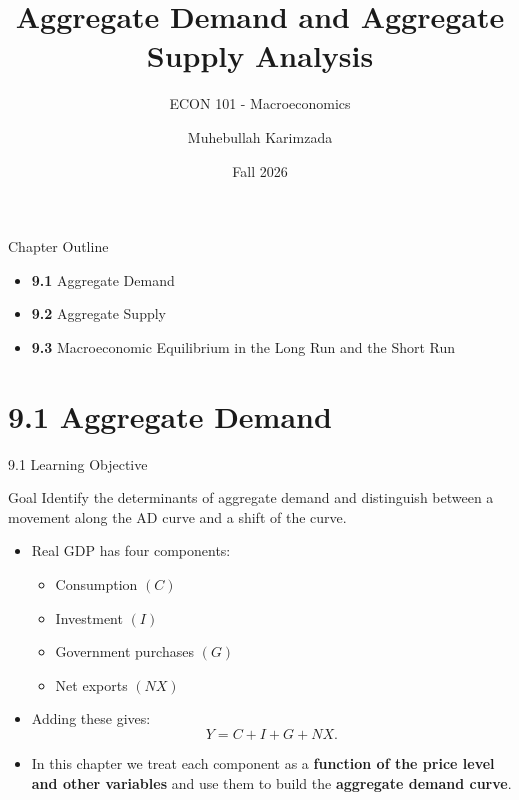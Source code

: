 \documentclass[aspectratio=169]{beamer}
\title{\textbf{Aggregate Demand and Aggregate Supply Analysis \vspace{.5cm}\\  }}
\subtitle{ {\large ECON 101 - Macroeconomics}}
\author{Muhebullah Karimzada}
\date{Fall 2026}
\begin{document}
\begin{frame}[plain]
  \titlepage
\end{frame}

\begin{frame}{Chapter Outline}
\transfade
\begin{itemize}
  \item \textbf{9.1} Aggregate Demand
  \item \textbf{9.2} Aggregate Supply
  \item \textbf{9.3} Macroeconomic Equilibrium in the Long Run and the Short Run
\end{itemize}
\end{frame}

\section{9.1 Aggregate Demand}

\begin{frame}{9.1 Learning Objective}
\transfade
\begin{block}{Goal}
Identify the determinants of aggregate demand and distinguish between a movement along the AD curve and a shift of the curve.
\end{block}
\begin{itemize}
  \item Real GDP has four components:
  \begin{itemize}
    \item Consumption \((C)\)
    \item Investment \((I)\)
    \item Government purchases \((G)\)
    \item Net exports \((NX)\)
  \end{itemize}
  \item Adding these gives:
  \[
    Y = C + I + G + NX.
  \]
  \item In this chapter we treat each component as a \textbf{function of the price level and other variables} and use them to build the \textbf{aggregate demand curve}.
\end{itemize}
\end{frame}
\end{document}

